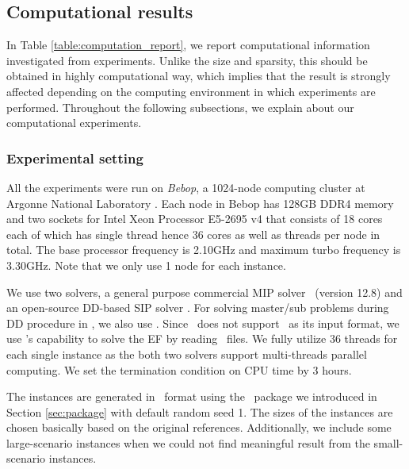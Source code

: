 \subsection{Computational results}
In Table \ref{table:computation_report}, we report computational information investigated from experiments. Unlike the size and sparsity, this should be obtained in highly computational way, which implies that the result is strongly affected depending on the computing environment in which experiments are performed. Throughout the following subsections, we explain about our computational experiments.

\subsubsection{Experimental setting}
All the experiments were run on \textit{Bebop}, a 1024-node computing cluster at Argonne National Laboratory \cite{bebop}. Each node in Bebop has 128GB DDR4 memory and two sockets for Intel Xeon Processor E5-2695 v4 that consists of 18 cores each of which has single thread hence 36 cores as well as threads per node in total. The base processor frequency is 2.10GHz and maximum turbo frequency is 3.30GHz. Note that we only use 1 node for each instance.

We use two solvers, a general purpose commercial MIP solver \cplex\ (version 12.8) and an open-source DD-based SIP solver \dsp. For solving master/sub problems during DD procedure in \dsp, we also use \cplex. Since \cplex\ does not support \smps\ as its input format, we use \dsp's capability to solve the EF by reading \smps\ files. We fully utilize 36 threads for each single instance as the both two solvers support multi-threads parallel computing. We set the termination condition on CPU time by 3 hours. 

The instances are generated in \smps\ format using the \julia\ package we introduced in Section \ref{sec:package} with default random seed 1. The sizes of the instances are chosen basically based on the original references. Additionally, we include some large-scenario instances when we could not find meaningful result from the small-scenario instances.

